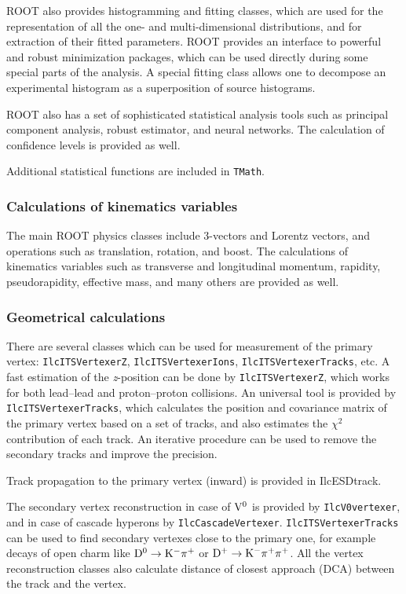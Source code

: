 \documentclass[12pt,a4paper,twoside]{article}
\makeatletter
\newcommand {\ROOT} {ROOT\@\xspace}
\makeatother
\begin{document}
{\ROOT also provides histogramming and fitting classes, which are used 
for the representation of all the one- and multi-dimensional
distributions, and for extraction of their fitted parameters. \ROOT provides
an interface to powerful and robust minimization packages, which can be 
used directly during some special parts of the analysis. A special
fitting class allows one to decompose an experimental histogram as a
superposition of source histograms.

\ROOT also has a set of sophisticated statistical analysis tools such as
principal component analysis, robust estimator, and neural networks.
The calculation of confidence levels is provided as well.

Additional statistical functions are included in \texttt{TMath}.

\subsubsection{Calculations of kinematics variables}

The main \ROOT physics classes include 3-vectors and Lorentz
vectors, and operations
such as translation, rotation, and boost. The calculations of
kinematics variables 
such as transverse and longitudinal momentum, rapidity,
pseudorapidity, effective mass, and many others are provided as well.


\subsubsection{Geometrical calculations}

There are several classes which can be used for
measurement of the primary vertex: \texttt{IlcITSVertexerZ},
\texttt{IlcITSVertexerIons}, \texttt{IlcITSVertexerTracks}, etc. A fast estimation of the {\it z}-position can be
done by \texttt{IlcITSVertexerZ}, which works for both lead--lead
and proton--proton collisions. An universal tool is provided by
\texttt{IlcITSVertexerTracks}, which calculates the position and
covariance matrix of the primary vertex based on a set of tracks, and
also estimates the $\chi^2$ contribution of each track. An iterative
procedure can be used to remove the secondary tracks and improve the
precision. 

Track propagation to the primary vertex (inward) is provided in
IlcESDtrack.

The secondary vertex reconstruction in case of ${\rm V^0}$ is provided by
\texttt{IlcV0vertexer}, and in case of cascade hyperons by
\texttt{IlcCascadeVertexer}. 
\texttt{IlcITSVertexerTracks} can be used to find secondary
vertexes close to the primary one, for example decays of open charm
like ${\rm D^0 \to K^- \pi^+}$ or ${\rm D^+ \to K^- \pi^+ \pi^+}$. All
the vertex 
reconstruction classes also calculate distance of closest approach (DCA)
between the track and the vertex.

}
\end{document}
